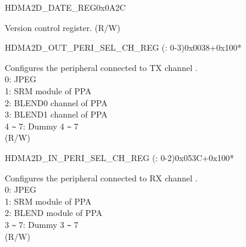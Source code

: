 \begin{register}{H}{DMA2D\_DATE\_REG}{0x0A2C}\label{regdesc:DMA2DDATEREG}
%
\regnewline%
\begin{regdesc}\begin{reglist}
\label{fielddesc:DMA2DDATE}\item [DMA2D\_DATE] Version control register. (R/W)
\end{reglist}\end{regdesc}
\end{register}


\begin{register}{H}{DMA2D\_OUT\_PERI\_SEL\_CH\_REG (: 0-3)}{0x0038+0x100*}\label{regdesc:DMA2DOUTPERISELCHNREG}
%
%
\regnewline%
\begin{regdesc}\begin{reglist}
\label{fielddesc:DMA2DOUTPERISELCHN}\item [DMA2D\_OUT\_PERI\_SEL\_CH\regindex{n}] Configures the peripheral connected to TX channel .\\
0: JPEG\\
1: SRM module of PPA\\
2: BLEND0 channel of PPA\\
3: BLEND1 channel of PPA\\
4 \verb+~+ 7: Dummy 4 \verb+~+ 7\\ (R/W)
\end{reglist}\end{regdesc}
\end{register}


\begin{register}{H}{DMA2D\_IN\_PERI\_SEL\_CH\_REG (: 0-2)}{0x053C+0x100*}\label{regdesc:DMA2DINPERISELCHNREG}
%
%
\regnewline%
\begin{regdesc}\begin{reglist}
\label{fielddesc:DMA2DINPERISELCHN}\item [DMA2D\_IN\_PERI\_SEL\_CH\regindex{n}] Configures the peripheral connected to RX channel .\\
0: JPEG\\
1: SRM module of PPA\\
2: BLEND module of PPA\\
3 \verb+~+ 7: Dummy 3 \verb+~+ 7\\ (R/W)
\end{reglist}\end{regdesc}
\end{register}
